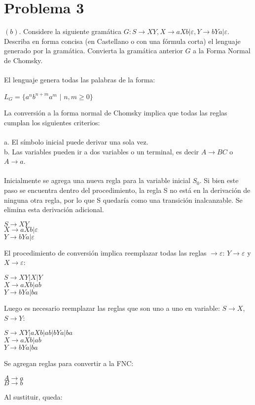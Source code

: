\documentclass[spanish]{article}
\def\e{\varepsilon}
\def\ra{\rightarrow}
\begin{document}
\section{Problema 3}
$(b)$.  Considere la siguiente gramática $G: S \ra XY , X \ra aXb | \e, Y \ra bYa | \e$. Describa en forma concisa (en Castellano o con una fórmula corta) el lenguaje generado por la gramática. Convierta la gramática anterior $G$ a la Forma Normal de Chomsky.
\\\\
El lenguaje genera todas las palabras de la forma:
\begin{center}
$L_G=\{a^nb^{n+m}a^m$ $|$ $n,m \geq 0\}$
\end{center}
La conversión a la forma normal de Chomsky implica que todas las reglas cumplan los siguientes criterios:
\\\\
a. El símbolo inicial puede derivar una sola vez.\\
b. Las variables pueden ir a dos variables o un terminal, es decir $A \ra BC$ o $A \ra a$. 
\\\\
Inicialmente se agrega una nueva regla para la variable inicial $S_0$. Si bien este paso se encuentra dentro del procedimiento, la regla S no está en la derivación de ninguna otra regla, por lo que S quedaría como una transición inalcanzable. Se elimina esta derivación adicional.
\begin{center}
$S \ra XY$\\
$X \ra aXb | \e$\\
$Y \ra bYa | \e$
\end{center}
El procedimiento de conversión implica reemplazar todas las reglas $\ra \e$: $Y \ra \e$ y $X \ra \e$:
\begin{center}
$S \ra XY|X|Y$\\
$X \ra aXb|ab$\\
$Y \ra bYa|ba$
\end{center}
Luego es necesario reemplazar las reglas que son uno a uno en variable: $S \ra X$, $S \ra Y$:
\begin{center}
$S \ra XY|aXb|ab|bYa|ba$\\
$X \ra aXb|ab$\\
$Y \ra bYa|ba$
\end{center}
Se agregan reglas para convertir a la FNC:
\begin{center}
$A \ra a$\\
$B \ra b$
\end{center}
Al sustituir, queda:
\end{document}
